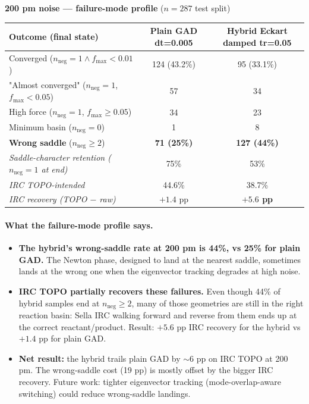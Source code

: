 \documentclass[11pt]{article}
\begin{document}
\begin{center}\footnotesize
\textbf{200 pm noise --- failure-mode profile} ($n=287$ test split)\\[0.4em]
\begin{tabular}{l|cc}
\toprule
\textbf{Outcome (final state)} & \textbf{Plain GAD dt=0.005} & \textbf{Hybrid Eckart damped tr=0.05} \\
\midrule
Converged ($n_\text{neg}{=}1 \wedge f_\text{max}<0.01$) & 124 (43.2\%) & 95 (33.1\%) \\
"Almost converged" ($n_\text{neg}{=}1$, $f_\text{max}<0.05$) & 57 & 34 \\
High force ($n_\text{neg}{=}1$, $f_\text{max}\ge 0.05$) & 34 & 23 \\
Minimum basin ($n_\text{neg}{=}0$) & 1 & 8 \\
\textbf{Wrong saddle} ($n_\text{neg}\ge 2$) & \textbf{71 (25\%)} & \textbf{127 (44\%)} \\
\midrule
\textit{Saddle-character retention ($n_\text{neg}{=}1$ at end)} & 75\% & 53\% \\
\textit{IRC TOPO-intended} & 44.6\% & 38.7\% \\
\textit{IRC recovery (TOPO $-$ raw)} & $+1.4$ pp & \textbf{$+5.6$ pp} \\
\bottomrule
\end{tabular}
\end{center}

\paragraph{What the failure-mode profile says.}
\begin{itemize}[leftmargin=1.5em, itemsep=0.05em]
\item \textbf{The hybrid's wrong-saddle rate at 200 pm is 44\%, vs
  25\% for plain GAD.} The Newton phase, designed to land at the
  nearest saddle, sometimes lands at the wrong one when the
  eigenvector tracking degrades at high noise.
\item \textbf{IRC TOPO partially recovers these failures.} Even though
  44\% of hybrid samples end at $n_\text{neg}\ge 2$, many of those
  geometries are still in the right reaction basin: Sella IRC walking
  forward and reverse from them ends up at the correct
  reactant/product. Result: $+5.6$ pp IRC recovery for the hybrid vs
  $+1.4$ pp for plain GAD.
\item \textbf{Net result:} the hybrid trails plain GAD by $\sim$6 pp
  on IRC TOPO at 200 pm. The wrong-saddle cost (19 pp) is mostly
  offset by the bigger IRC recovery. Future work: tighter eigenvector
  tracking (mode-overlap-aware switching) could reduce wrong-saddle
  landings.
\end{itemize}
\end{document}
